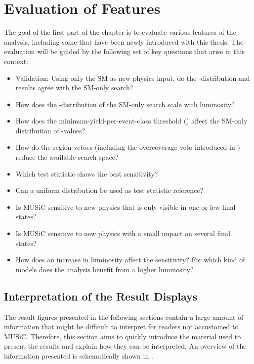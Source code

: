 \section{Evaluation of Features}
The goal of the first part of the chapter is to evaluate various features of the analysis, including some that have been newly introduced with this thesis. The evaluation will be guided by the following set of key questions that arise in this context:
\begin{itemize}
    \setlength{\parskip}{0.5em}
    \setlength{\itemsep}{0ex}
    \item Validation: Using only the \ac{SM} as new physics input, do the \ptilde-distribution and \phat results agree with the \ac{SM}-only search?
    \item How does the \ptilde-distribution of the \ac{SM}-only search scale with luminosity?
    \item How does the minimum-yield-per-event-class threshold () affect the \ac{SM}-only distribution of \ptilde-values?
    \item How do the region vetoes (including the overcoverage veto introduced in ) reduce the available search space?
    \item Which test statistic \TSphat shows the best sensitivity?
    \item Can a uniform distribution be used as test statistic reference?
    \item Is \ac{MUSiC} sensitive to new physics that is only visible in one or few final states?
    \item Is \ac{MUSiC} sensitive to new physics with a small impact on several final states?    
    \item How does an increase in luminosity affect the sensitivity? For which kind of models does the analysis benefit from a higher luminosity?
\end{itemize}

\subsection{Interpretation of the Result Displays}
\label{sec:how_to_read_plots}

The result figures presented in the following sections contain a large amount of information that might be difficult to interpret for readers not accustomed to \ac{MUSiC}. Therefore, this section aims to quickly introduce the material used to present the results and explain how they can be interpreted. An overview of the information presented is schematically shown in .


